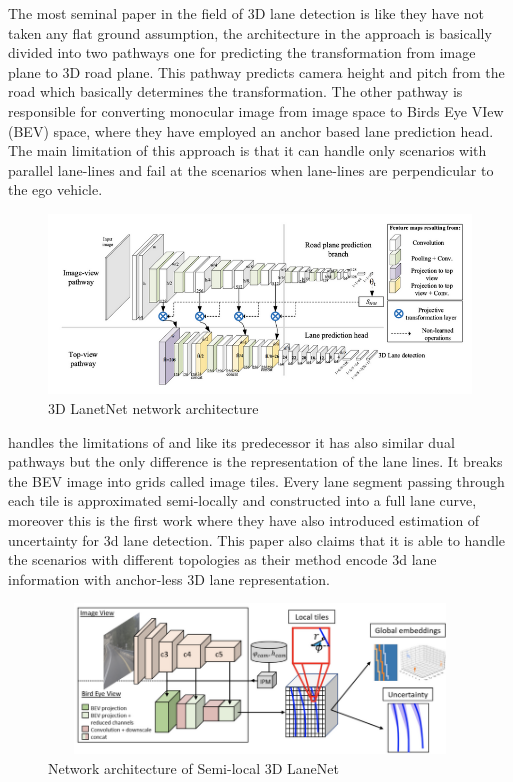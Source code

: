 The most seminal paper in the field of 3D lane detection is \cite{DBLP:journals/corr/abs-1811-10203} like \cite{DBLP:journals/corr/abs-1802-05591} they have not taken any flat ground assumption, the architecture in the approach is basically divided into two pathways one for predicting the transformation from image plane to 3D road plane. This pathway predicts camera height and pitch from the road which basically determines the transformation. The other pathway is responsible for converting monocular image from image space to Birds Eye VIew (BEV) space, where they have employed an anchor based lane prediction head. The main limitation of this approach is that it can handle only scenarios with parallel lane-lines and fail at the scenarios when lane-lines are perpendicular to the ego vehicle. 

\begin{figure}[h]
    \centering
    \includegraphics[width=\textwidth]{images/3dlanenet.png}
    \caption{\cite{DBLP:journals/corr/abs-1811-10203} 3D LanetNet network architecture}
    \end{figure}

\cite{DBLP:journals/corr/abs-2011-01535} handles the limitations of \cite{DBLP:journals/corr/abs-1811-10203} and like its predecessor it has also similar dual pathways but the only difference is the representation of the lane lines. It breaks the BEV image into grids called image tiles.
Every lane segment passing through each tile is approximated semi-locally and constructed into a full lane curve, moreover this is the first work where they have also introduced estimation of uncertainty for 3d lane detection. This paper also claims that it is able to handle the scenarios with different topologies as their method encode 3d lane information with anchor-less 3D lane representation. 

 \begin{figure}[h]
    \centering
    \includegraphics[width=12cm, height=4cm]{images/3DLaneNET++.png}
    \caption{Network architecture of Semi-local 3D LaneNet \cite{DBLP:journals/corr/abs-2011-01535}}
    \end{figure}

